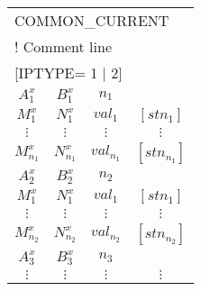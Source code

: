 \begin{fileExample}
\begin{tabular}{|cccc|}
\hline
\multicolumn{4}{|l|}{COMMON\_CURRENT} \\
\multicolumn{4}{|l|}{! Comment line} \\
\multicolumn{4}{|l|}{[IPTYPE= 1 | 2]} \\
$A_1^x$ & $B_1^x$ &  $n_1$ & \\
$M_1^x$ & $N_1^x$ &  $val_1$ & $[stn_1]$ \\
$\vdots$ & $\vdots$ & $\vdots$ & $\vdots$\\
$M_{n_1}^x$ & $N_{n_1}^x$ & $val_{n_1}$ & $[stn_{n_1}]$ \\ 
$A_2^x$ & $B_2^x$ & $n_2$ & \\
$M_1^x$ & $N_1^x$  & $val_1$ & $[stn_1]$ \\
$\vdots$ & $\vdots$ & $\vdots$ & $\vdots$\\
$M_{n_2}^x$ & $N_{n_2}^x$ & $val_{n_2}$ & $[stn_{n_2}]$ \\ 
$A_3^x$ & $B_3^x$ & $n_3$ & \\
$\vdots$ & $\vdots$ & $\vdots$ & $\vdots$\\
\hline
\end{tabular}
\end{fileExample}

